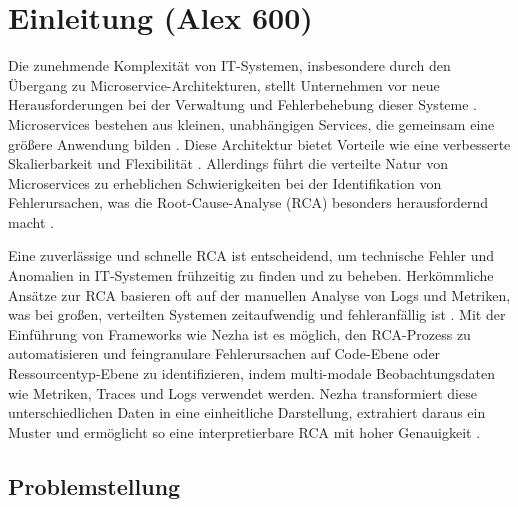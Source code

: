 


\chapter{Einleitung (Alex 600)}
\label{sec:Einleitung} %


Die zunehmende Komplexität von IT-Systemen, insbesondere durch den Übergang zu Microservice-Architekturen, stellt Unternehmen vor neue Herausforderungen bei der Verwaltung und Fehlerbehebung dieser Systeme . Microservices bestehen aus kleinen, unabhängigen Services, die gemeinsam eine größere Anwendung bilden . Diese Architektur bietet Vorteile wie eine verbesserte Skalierbarkeit und Flexibilität . Allerdings führt die verteilte Natur von Microservices zu erheblichen Schwierigkeiten bei der Identifikation von Fehlerursachen, was die Root-Cause-Analyse (RCA) besonders herausfordernd macht .

Eine zuverlässige und schnelle RCA ist entscheidend, um technische Fehler und Anomalien in IT-Systemen frühzeitig zu finden und zu beheben. Herkömmliche Ansätze zur RCA basieren oft auf der manuellen Analyse von Logs und Metriken, was bei großen, verteilten Systemen zeitaufwendig und fehleranfällig ist . Mit der Einführung von Frameworks wie Nezha ist es möglich, den RCA-Prozess zu automatisieren und feingranulare Fehlerursachen auf Code-Ebene oder Ressourcentyp-Ebene zu identifizieren, indem multi-modale Beobachtungsdaten wie Metriken, Traces und Logs verwendet werden. Nezha transformiert diese unterschiedlichen Daten in eine einheitliche Darstellung, extrahiert daraus ein Muster und ermöglicht so eine interpretierbare RCA mit hoher Genauigkeit .


\section{Problemstellung}

